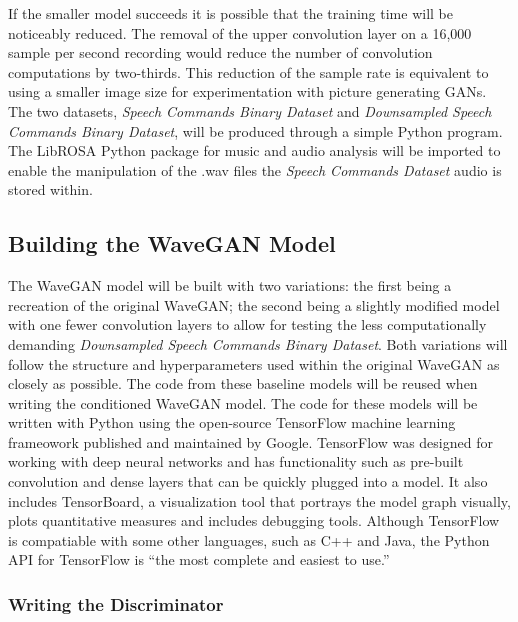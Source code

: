 \documentclass[a4paper, dvipsnames, titlepage]{article}
\begin{document}
If the smaller model succeeds it is possible that the training time will be noticeably reduced.
The removal of the upper convolution layer on a 16,000 sample per second recording would reduce the number of convolution computations by two-thirds.
This reduction of the sample rate is equivalent to using a smaller image size for experimentation with picture generating GANs.
\newline
\newline
The two datasets, \textit{Speech Commands Binary Dataset} and \textit{Downsampled Speech Commands Binary Dataset}, will be produced through a simple Python program.
The LibROSA Python package for music and audio analysis will be imported to enable the manipulation of the .wav files the \textit{Speech Commands Dataset} audio is stored within.

\subsection{Building the WaveGAN Model}

The WaveGAN model will be built with two variations: the first being a recreation of the original WaveGAN; the second being a slightly modified model with one fewer convolution layers to allow for testing the less computationally demanding \textit{Downsampled Speech Commands Binary Dataset}.
Both variations will follow the structure and hyperparameters used within the original WaveGAN as closely as possible.
The code from these baseline models will be reused when writing the conditioned WaveGAN model.
\newline
\newline
The code for these models will be written with Python using the open-source TensorFlow machine learning frameowork published and maintained by Google.
TensorFlow was designed for working with deep neural networks and has functionality such as pre-built convolution and dense layers that can be quickly plugged into a model.
It also includes TensorBoard, a visualization tool that portrays the model graph visually, plots quantitative measures and includes debugging tools.
Although TensorFlow is compatiable with some other languages, such as C++ and Java, the Python API for TensorFlow is ``the most complete and easiest to use.'' \citep{TensorFlowAPI}

\subsubsection{Writing the Discriminator}
\end{document}
